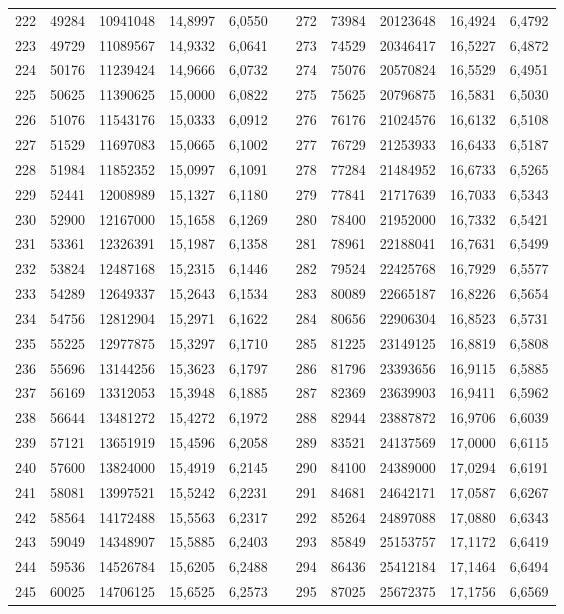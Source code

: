 \begin{longtable}{rrrrrrrrrrr}
222&49284&10941048&14,8997&6,0550&&272&73984&20123648&16,4924&6,4792\\
223&49729&11089567&14,9332&6,0641&&273&74529&20346417&16,5227&6,4872\\
224&50176&11239424&14,9666&6,0732&&274&75076&20570824&16,5529&6,4951\\
225&50625&11390625&15,0000&6,0822&&275&75625&20796875&16,5831&6,5030\\
226&51076&11543176&15,0333&6,0912&&276&76176&21024576&16,6132&6,5108\\
227&51529&11697083&15,0665&6,1002&&277&76729&21253933&16,6433&6,5187\\
228&51984&11852352&15,0997&6,1091&&278&77284&21484952&16,6733&6,5265\\
229&52441&12008989&15,1327&6,1180&&279&77841&21717639&16,7033&6,5343\\
230&52900&12167000&15,1658&6,1269&&280&78400&21952000&16,7332&6,5421\\
231&53361&12326391&15,1987&6,1358&&281&78961&22188041&16,7631&6,5499\\
232&53824&12487168&15,2315&6,1446&&282&79524&22425768&16,7929&6,5577\\
233&54289&12649337&15,2643&6,1534&&283&80089&22665187&16,8226&6,5654\\
234&54756&12812904&15,2971&6,1622&&284&80656&22906304&16,8523&6,5731\\
235&55225&12977875&15,3297&6,1710&&285&81225&23149125&16,8819&6,5808\\
236&55696&13144256&15,3623&6,1797&&286&81796&23393656&16,9115&6,5885\\
237&56169&13312053&15,3948&6,1885&&287&82369&23639903&16,9411&6,5962\\
238&56644&13481272&15,4272&6,1972&&288&82944&23887872&16,9706&6,6039\\
239&57121&13651919&15,4596&6,2058&&289&83521&24137569&17,0000&6,6115\\
240&57600&13824000&15,4919&6,2145&&290&84100&24389000&17,0294&6,6191\\
241&58081&13997521&15,5242&6,2231&&291&84681&24642171&17,0587&6,6267\\
242&58564&14172488&15,5563&6,2317&&292&85264&24897088&17,0880&6,6343\\
243&59049&14348907&15,5885&6,2403&&293&85849&25153757&17,1172&6,6419\\
244&59536&14526784&15,6205&6,2488&&294&86436&25412184&17,1464&6,6494\\
245&60025&14706125&15,6525&6,2573&&295&87025&25672375&17,1756&6,6569\\

\end{longtable}
